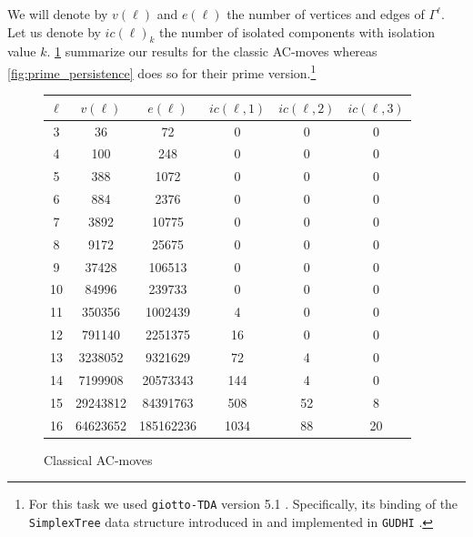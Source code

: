 We will denote by $v(\ell)$ and $e(\ell)$ the number of vertices and edges of $\Gamma^\ell$.
Let us denote by $ic(\ell)_k$ the number of isolated components with isolation value $k$.
\cref{fig:classical_persistence} summarize our results for the classic AC-moves whereas \cref{fig:prime_persistence} does so for their prime version.\footnote{For this task we used \texttt{giotto-TDA} version 5.1 \cite{tauzin2021giotto}.
	Specifically, its binding of the \texttt{SimplexTree} data structure introduced in \cite{boissonnat2014simplex} and implemented in \texttt{GUDHI} \cite{maria2014gudhi}.}

\begin{figure}
	\begin{tabular}{|c|c|c|c|c|c|}
		\hline
		$\ell$ & $v(\ell)$ & $e(\ell)$ & $ic(\ell,1)$ & $ic(\ell,2)$ & $ic(\ell,3)$ \\ \hline
		3 & 36 & 72 & 0 & 0 & 0 \\ \hline
		4 & 100 & 248 & 0 & 0 & 0 \\ \hline
		5 & 388 & 1072 & 0 & 0 & 0 \\ \hline
		6 & 884 & 2376 & 0 & 0 & 0 \\ \hline
		7 & 3892 & 10775 & 0 & 0 & 0 \\ \hline
		8 & 9172 & 25675 & 0 & 0 & 0 \\ \hline
		9 & 37428 & 106513 & 0 & 0 & 0 \\ \hline
		10 & 84996 & 239733 & 0 & 0 & 0 \\ \hline
		11 & 350356 & 1002439 & 4 & 0 & 0 \\ \hline
		12 & 791140 & 2251375 & 16 & 0 & 0 \\ \hline
		13 & 3238052 & 9321629 & 72 & 4 & 0 \\ \hline
		14 & 7199908 & 20573343 & 144 & 4 & 0 \\ \hline
		15 & 29243812 & 84391763 & 508 & 52 & 8 \\ \hline
		16 & 64623652 & 185162236 & 1034 & 88 & 20 \\ \hline
	\end{tabular}
	\caption{Classical AC-moves}
	\label{fig:classical_persistence}
\end{figure}


